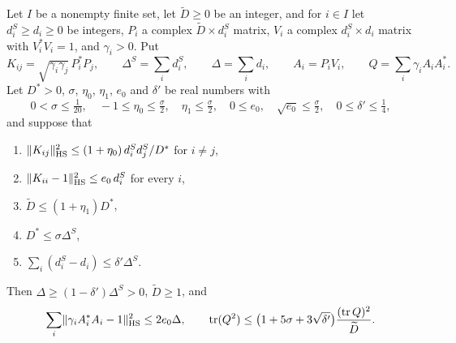 \begin{proposition}\label{r3:gram}
Let $I$ be a nonempty finite set, let $\widetilde D\ge0$ be an integer, and for $i\in I$ let $d_i^S\ge d_i\ge0$ be integers, $P_i$ a complex $\widetilde D\times d^S_i$ matrix, $V_i$ a complex $d^S_i\times d_i$ matrix with $V_i^*V_i=1$, and $\gamma_i>0$. Put
\[
K_{ij}=\sqrt{\gamma_i\gamma_j}\,P_i^*P_j,\qquad \Delta^S=\sum_id^S_i,\qquad \Delta=\sum_id_i,\qquad A_i=P_iV_i,\qquad Q=\sum_i\gamma_iA_iA_i^* .
\]
Let $D^*>0$, $\sigma$, $\eta_0$, $\eta_1$, $e_0$ and $\delta'$ be real numbers with
\[
0<\sigma\le\tfrac1{20},\quad-1\le\eta_0\le\tfrac\sigma2,\quad\eta_1\le\tfrac\sigma2,\quad0\le e_0,\quad\sqrt{e_0}\le\tfrac\sigma2,\quad0\le\delta'\le\tfrac14,
\]
and suppose that
\begin{enumerate}
\item[(G1)] $\lVert K_{ij}\rVert_{\mathrm{HS}}^2\le(1+\eta_0)\,d^S_id^S_j/D^*$ for $i\ne j$,
\item[(G2)] $\lVert K_{ii}-1\rVert_{\mathrm{HS}}^2\le e_0\,d^S_i$ for every $i$,
\item[(G3)] $\widetilde D\le(1+\eta_1)D^*$,
\item[(G4)] $D^*\le\sigma \Delta^S$,
\item[(G5)] $\sum_i(d^S_i-d_i)\le\delta'\Delta^S$.
\end{enumerate}
Then $\Delta\ge(1-\delta')\Delta^S>0$, $\widetilde D\ge1$, and
\[
\sum_i\lVert\gamma_iA_i^*A_i-1\rVert_{\mathrm{HS}}^2\le2e_0\Delta,\qquad\operatorname{tr}(Q^2)\le\big(1+5\sigma+3\sqrt{\delta'}\big)\frac{(\operatorname{tr} Q)^2}{\widetilde D}.
\]
\end{proposition}

